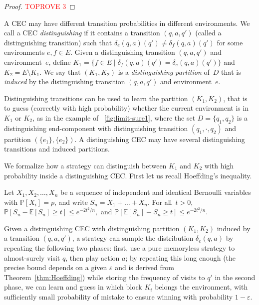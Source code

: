 \documentclass[a4paper,USenglish,cleveref, autoref, thm-restate]{lipics-v2021}
\let\epsilon\varepsilon
\newcommand*{\pr}{\mathbb{P}}
\newcommand*{\expect}{\mathbb{E}}
\begin{document}
\begin{proof}\textcolor{red}{TOPROVE 3}\end{proof}


A CEC may have different transition probabilities in different environments.
We call a CEC \emph{distinguishing} if it contains a transition $(q,a,q')$ (called a distinguishing transition) such that
$\delta_e(q,a)(q') \neq   \delta_{f}(q,a)(q')$
for some environments $e,f \in E$. 
Given a distinguishing transition $(q,a,q')$ and environment~$e$, define
$K_1 = \{f \in E \mid \delta_f(q,a)(q') = \delta_e(q,a)(q')\}$ and $K_2 = E \setminus K_1$.
We say that $(K_1,K_2)$ is a \emph{distinguishing partition} of~$D$ that is \emph{induced} by the distinguishing 
transition $(q,a,q')$ and environment~$e$.

Distinguishing transitions can be used to learn the partition $(K_1,K_2)$, that is to guess (correctly with high probability) whether the current environment is in $K_1$ or $K_2$, as in the example of \figurename~\ref{fig:limit-sure1}, where the set $D = \{q_1,q_2\}$ is a distinguishing end-component with distinguishing transition $(q_1,\cdot,q_2)$ and partition $(\{e_1\},\{e_2\})$. A distinguishing CEC may have several distinguishing transitions and induced partitions.


We formalize how a strategy can distinguish between $K_1$ and $K_2$ with high probability inside a distinguishing CEC.
First let us recall Hoeffding's inequality.

\begin{theorem}
	\label{thm:Hoeffding}
	Let $X_1,X_2,\ldots,X_n$ be a sequence of independent and identical Bernoulli variables with $\pr[X_i] = p$,
	and write $S_n = X_1+\ldots +X_n$. For all~$t> 0$,
	\(
		\pr[S_n - \expect[S_n] \geq t] \leq e^{-2t^2/n},
	\)
	and
	\(
		\pr[\expect[S_n] -S_n\geq t] \leq e^{-2t^2/n}.
	\)
\end{theorem}

Given a distinguishing CEC with distinguishing partition  $(K_1,K_2)$ induced by a transition $(q,a,q')$, a strategy can sample the distribution
$\delta_e(q,a)$ by repeating the following two phases: first, use a pure memoryless strategy to almost-surely visit $q$, then play action $a$; by repeating this long enough (the precise bound depends on a given $\epsilon$ and is derived from Theorem~\ref{thm:Hoeffding}) while storing the frequency of visits to $q'$ in the second phase, we can learn and guess in which block $K_i$ belongs the environment, with sufficiently small probability of mistake to ensure winning with probability $1-\epsilon$.
\end{document}
